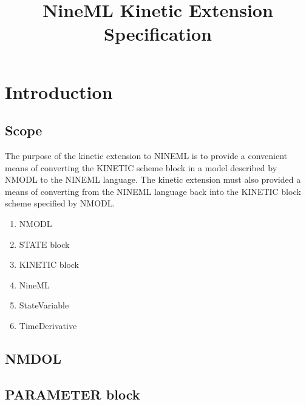 \documentclass[draftspec]{ninemlspec}
\begin{document}
\title{NineML Kinetic Extension Specification}

\newpage
\pagestyle{plain}


\section{Introduction}
\vspace{-12.5pc} %


\subsection{Scope}

The purpose of the kinetic extension to NINEML is to provide a convenient means of converting the KINETIC scheme block in a model described by NMODL to the NINEML language. 
The kinetic extension must also provided a means of converting from the NINEML language back into the KINETIC block scheme specified by NMODL.

\begin{enumerate}
\item NMODL
\item STATE block
\item KINETIC block
\item NineML
\item StateVariable
\item TimeDerivative
\end{enumerate}




\subsection{NMDOL}
\label{sec:\item NMODL}

\subsection{PARAMETER block}
\end{document}
